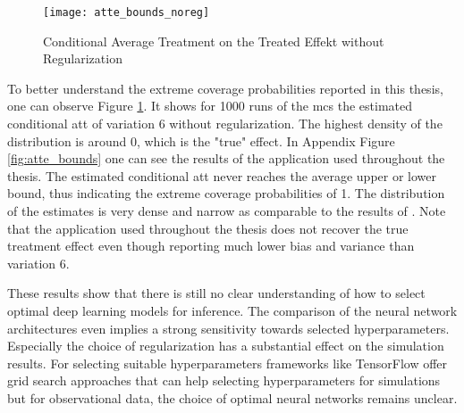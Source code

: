 \begin{figure}[h]
\centering
\caption{Conditional Average Treatment on the Treated Effekt without Regularization}
\texttt{[image: atte\_bounds\_noreg]}
\label{fig:atte_bounds_noreg}
\end{figure}
To better understand the extreme coverage probabilities reported in this thesis, one can observe Figure \ref{fig:atte_bounds_noreg}.
It shows for 1000 runs of the \ac{mcs} the estimated conditional \ac{att} of variation 6 without regularization.
The highest density of the distribution is around 0, which is the "true" effect.
In Appendix Figure \ref{fig:atte_bounds} one can see the results of the application used throughout the thesis.
The estimated conditional \ac{att} never reaches the average upper or lower bound, thus indicating the extreme coverage probabilities of 1.
The distribution of the estimates is very dense and narrow as comparable to the results of \citet{farrellDeepNeuralNetworks2021}.
Note that the application used throughout the thesis does not recover the true treatment effect even though reporting much lower bias and variance than variation 6.

These results show that there is still no clear understanding of how to select optimal deep learning models for inference.
The comparison of the neural network architectures even implies a strong sensitivity towards selected hyperparameters.
Especially the choice of regularization has a substantial effect on the simulation results.
For selecting suitable hyperparameters frameworks like TensorFlow\textsuperscript{\textregistered} offer grid search approaches that can help selecting hyperparameters for simulations but for observational data, the choice of optimal neural networks remains unclear.
